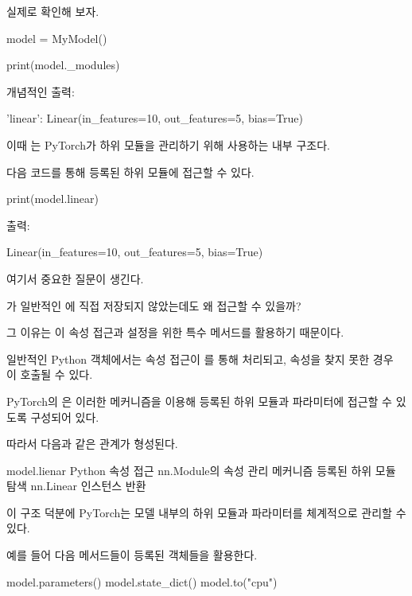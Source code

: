 실제로 확인해 보자.

\begin{dhkcode}
model = MyModel()

print(model._modules)
\end{dhkcode}

개념적인 출력:

\begin{dhkzsh}
{'linear': Linear(in_features=10, out_features=5, bias=True)}
\end{dhkzsh}

이때 는 PyTorch가 하위 모듈을 관리하기 위해 사용하는 내부 구조다.

다음 코드를 통해 등록된 하위 모듈에 접근할 수 있다.

\begin{dhkcode}
print(model.linear)
\end{dhkcode}

출력:

\begin{dhkzsh}
Linear(in_features=10, out_features=5, bias=True)
\end{dhkzsh}

여기서 중요한 질문이 생긴다.

가 일반적인 에 직접 저장되지 않았는데도 왜 접근할 수 있을까?

그 이유는 이 속성 접근과 설정을 위한 특수 메서드를 활용하기 때문이다.

일반적인 Python 객체에서는 속성 접근이 를 통해 처리되고, 속성을 찾지 못한 경우 이 호출될 수 있다.

PyTorch의 은 이러한 메커니즘을 이용해 등록된 하위 모듈과 파라미터에 접근할 수 있도록 구성되어 있다.

따라서 다음과 같은 관계가 형성된다.

\begin{dhksmry}[centered]
model.lienar
\da
Python 속성 접근
\da
nn.Module의 속성 관리 메커니즘
\da
등록된 하위 모듈 탐색
\da
nn.Linear 인스턴스 반환
\end{dhksmry}

이 구조 덕분에 PyTorch는 모델 내부의 하위 모듈과 파라미터를 체계적으로 관리할 수 있다.

예를 들어 다음 메서드들이 등록된 객체들을 활용한다.

\begin{dhkcode}
model.parameters()
model.state_dict()
model.to("cpu")
\end{dhkcode}

